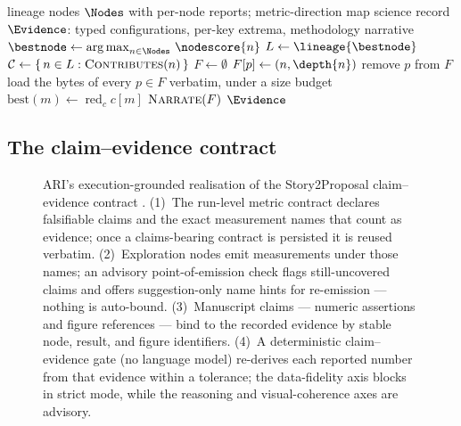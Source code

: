 \begin{algorithm}[t]
\small
\caption{Evidence assembly (exploration $\to$ writer input).}
\label{alg:evidence-assembly}
\begin{algorithmic}[1]
\Require lineage nodes $\Nodes$ with per-node reports; metric-direction map
\Ensure  science record $\Evidence$: typed configurations, per-key
         extrema, methodology narrative
\State $\bestnode \gets \operatorname*{arg\,max}_{n \in \Nodes}\, \nodescore{n}$
\State $L \gets \lineage{\bestnode}$ 
\State $\mathcal{C} \gets \{\, n \in L : \textsc{Contributes}(n) \,\}$
\State $F \gets \emptyset$ 
      \State $F[p] \gets (n, \depth{n})$ 
    \EndIf
  \EndFor
    \State remove $p$ from $F$ 
  \EndFor
\EndFor
\State load the bytes of every $p \in F$ verbatim, under a size budget
  \State $\mathrm{best}(m) \gets \operatorname*{red}_{c} c[m]$
\EndFor
\State $\textsc{Narrate}(F)$
\State \Return $\Evidence$
\end{algorithmic}
\end{algorithm}

\subsection{The claim--evidence contract}\label{sec:paper:contract}

\begin{figure}[t]
  \centering
  \resizebox{\columnwidth}{!}{}
  \caption{ARI's execution-grounded realisation of the Story2Proposal
           claim--evidence contract \cite{qian2026story2proposal}.
           (1)~The run-level metric contract declares falsifiable claims
           and the exact measurement names that count as evidence; once a
           claims-bearing contract is persisted it is reused verbatim.
           (2)~Exploration nodes emit measurements under those names; an
           advisory point-of-emission check flags still-uncovered claims
           and offers suggestion-only name hints for re-emission ---
           nothing is auto-bound. (3)~Manuscript claims --- numeric
           assertions and figure references --- bind to the recorded
           evidence by stable node, result, and figure identifiers.
           (4)~A deterministic claim--evidence gate (no language model)
           re-derives each reported number from that evidence within a
           tolerance; the data-fidelity axis blocks in strict mode, while
           the reasoning and visual-coherence axes are advisory.}
  \label{fig:claim-evidence}
\end{figure}

